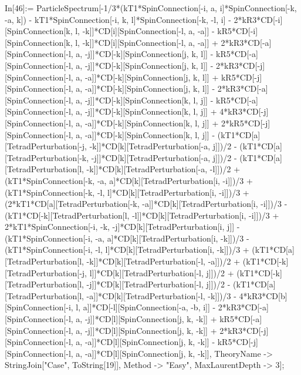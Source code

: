 In[46]:= ParticleSpectrum[-1/3*(kT1*SpinConnection[-i, a, i]*SpinConnection[-k, -a, k]) - kT1*SpinConnection[-i, k, l]*SpinConnection[-k, -l, i] - 2*kR3*CD[-i][SpinConnection[k, l, -k]]*CD[i][SpinConnection[-l, a, -a]] - kR5*CD[-i][SpinConnection[k, l, -k]]*CD[i][SpinConnection[-l, a, -a]] + 2*kR3*CD[-a][SpinConnection[-l, a, -j]]*CD[-k][SpinConnection[j, k, l]] - kR5*CD[-a][SpinConnection[-l, a, -j]]*CD[-k][SpinConnection[j, k, l]] - 2*kR3*CD[-j][SpinConnection[-l, a, -a]]*CD[-k][SpinConnection[j, k, l]] + kR5*CD[-j][SpinConnection[-l, a, -a]]*CD[-k][SpinConnection[j, k, l]] - 2*kR3*CD[-a][SpinConnection[-l, a, -j]]*CD[-k][SpinConnection[k, l, j]] - kR5*CD[-a][SpinConnection[-l, a, -j]]*CD[-k][SpinConnection[k, l, j]] + 4*kR3*CD[-j][SpinConnection[-l, a, -a]]*CD[-k][SpinConnection[k, l, j]] + 2*kR5*CD[-j][SpinConnection[-l, a, -a]]*CD[-k][SpinConnection[k, l, j]] - (kT1*CD[a][TetradPerturbation[-j, -k]]*CD[k][TetradPerturbation[-a, j]])/2 - (kT1*CD[a][TetradPerturbation[-k, -j]]*CD[k][TetradPerturbation[-a, j]])/2 - (kT1*CD[a][TetradPerturbation[l, -k]]*CD[k][TetradPerturbation[-a, -l]])/2 + (kT1*SpinConnection[-k, -a, a]*CD[k][TetradPerturbation[i, -i]])/3 + (kT1*SpinConnection[-k, -l, l]*CD[k][TetradPerturbation[i, -i]])/3 + (2*kT1*CD[a][TetradPerturbation[-k, -a]]*CD[k][TetradPerturbation[i, -i]])/3 - (kT1*CD[-k][TetradPerturbation[l, -l]]*CD[k][TetradPerturbation[i, -i]])/3 + 2*kT1*SpinConnection[-i, -k, -j]*CD[k][TetradPerturbation[i, j]] - (kT1*SpinConnection[-i, -a, a]*CD[k][TetradPerturbation[i, -k]])/3 - (kT1*SpinConnection[-i, -l, l]*CD[k][TetradPerturbation[i, -k]])/3 + (kT1*CD[a][TetradPerturbation[l, -k]]*CD[k][TetradPerturbation[-l, -a]])/2 + (kT1*CD[-k][TetradPerturbation[-j, l]]*CD[k][TetradPerturbation[-l, j]])/2 + (kT1*CD[-k][TetradPerturbation[l, -j]]*CD[k][TetradPerturbation[-l, j]])/2 - (kT1*CD[a][TetradPerturbation[l, -a]]*CD[k][TetradPerturbation[-l, -k]])/3 - 4*kR3*CD[b][SpinConnection[-i, l, a]]*CD[-l][SpinConnection[-a, -b, i]] - 2*kR3*CD[-a][SpinConnection[-l, a, -j]]*CD[l][SpinConnection[j, k, -k]] + kR5*CD[-a][SpinConnection[-l, a, -j]]*CD[l][SpinConnection[j, k, -k]] + 2*kR3*CD[-j][SpinConnection[-l, a, -a]]*CD[l][SpinConnection[j, k, -k]] - kR5*CD[-j][SpinConnection[-l, a, -a]]*CD[l][SpinConnection[j, k, -k]], TheoryName -> StringJoin["Case", ToString[19]], Method -> "Easy", MaxLaurentDepth -> 3]; 